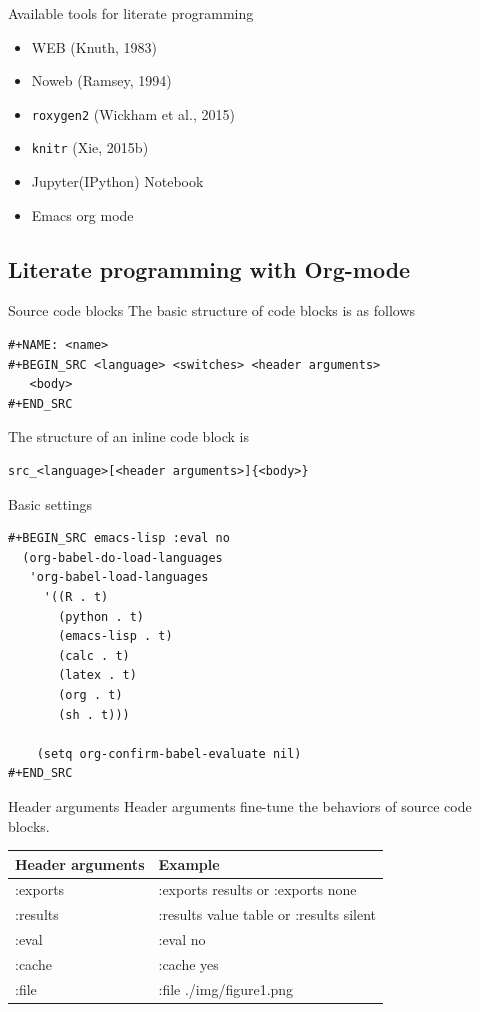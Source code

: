 \documentclass[presentation]{beamer}
\begin{document}
\begin{frame}[fragile,label={sec:org77ab94d}]{Available tools for literate programming}
 \begin{itemize}
\item WEB (Knuth, 1983)
\item Noweb (Ramsey, 1994)
\item \texttt{roxygen2} (Wickham et al., 2015)
\item \texttt{knitr} (Xie, 2015b)
\item Jupyter(IPython) Notebook
\item Emacs org mode
\end{itemize}
\end{frame}


\subsection{Literate programming with Org-mode}
\label{sec:orgc9b9a5a}

\begin{frame}[fragile,label={sec:orgfc6f05c}]{Source code blocks}
 The basic structure of code blocks is as follows

\begin{verbatim}
#+NAME: <name>
#+BEGIN_SRC <language> <switches> <header arguments>
   <body>
#+END_SRC
\end{verbatim}

The structure of an inline code block is

\begin{verbatim}
src_<language>[<header arguments>]{<body>}
\end{verbatim}
\end{frame}

\begin{frame}[fragile,label={sec:org62ee8a8}]{Basic settings}
 \begin{verbatim}
#+BEGIN_SRC emacs-lisp :eval no
  (org-babel-do-load-languages
   'org-babel-load-languages
     '((R . t)
       (python . t)
       (emacs-lisp . t)
       (calc . t)
       (latex . t)
       (org . t)
       (sh . t)))

    (setq org-confirm-babel-evaluate nil)
#+END_SRC
\end{verbatim}
\end{frame}

\begin{frame}[label={sec:orgc8f364e}]{Header arguments}
Header arguments fine-tune the behaviors of source code blocks.

\begin{center}
\begin{tabular}{ll}
Header arguments & Example\\
\hline
:exports & :exports results or :exports none\\
:results & :results value table or :results silent\\
:eval & :eval no\\
:cache & :cache yes\\
:file & :file ./img/figure1.png\\
\end{tabular}
\end{center}
\end{frame}
\end{document}
